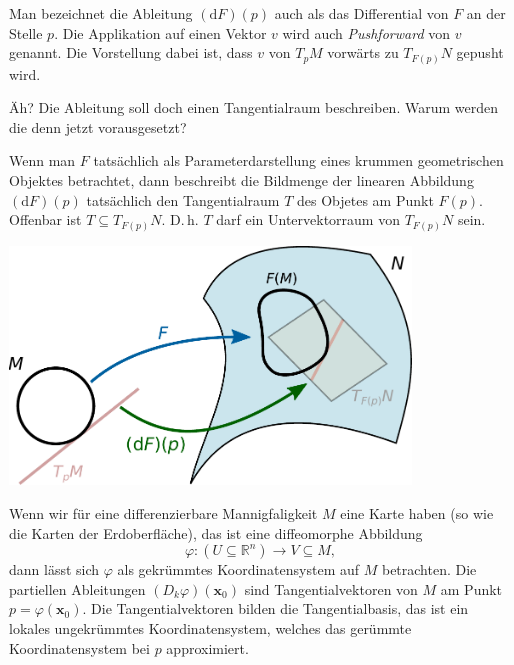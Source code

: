 \documentclass{beamer}
\newcommand{\R}{\mathbb R}
\begin{document}
\begin{frame}
Man bezeichnet die Ableitung $(\mathrm dF)(p)$ auch als das
Differential von $F$ an der Stelle $p$. Die Applikation auf einen
Vektor $v$ wird auch \emph{Pushforward} von $v$ genannt.
Die Vorstellung dabei ist, dass $v$
von $T_pM$ vorwärts zu $T_{F(p)}N$ gepusht wird.
\end{frame}

\begin{frame}
Äh? Die Ableitung soll doch einen Tangentialraum beschreiben.
Warum werden die denn jetzt vorausgesetzt?
\end{frame}

\begin{frame}
Wenn man $F$ tatsächlich als Parameterdarstellung eines krummen
geometrischen Objektes betrachtet, dann beschreibt die Bildmenge
der linearen Abbildung $(\mathrm dF)(p)$ tatsächlich den
Tangentialraum $T$ des Objetes am Punkt $F(p)$. Offenbar ist
$T\subseteq T_{F(p)}N$. D.\,h. $T$ darf ein Untervektorraum
von $T_{F(p)}N$ sein.
\end{frame}

\begin{frame}
\begin{center}
\includegraphics[width=0.8\textwidth]{img/Differential.pdf}
\end{center}
\end{frame}

\begin{frame}
Wenn wir für eine differenzierbare Mannigfaligkeit $M$ eine Karte
haben (so wie die Karten der Erdoberfläche), das ist eine diffeomorphe
Abbildung
\[\varphi\colon (U\subseteq \R^n)\to V\subseteq M,\]
dann lässt sich $\varphi$ als gekrümmtes Koordinatensystem auf $M$
betrachten. Die partiellen Ableitungen $(D_k\varphi)(\mathbf x_0)$ sind
Tangentialvektoren von $M$ am Punkt $p=\varphi(\mathbf x_0)$.
Die Tangentialvektoren bilden die Tangentialbasis, das ist ein lokales
ungekrümmtes Koordinatensystem, welches das gerümmte Koordinatensystem
bei $p$ approximiert. 
\end{frame}
\end{document}
